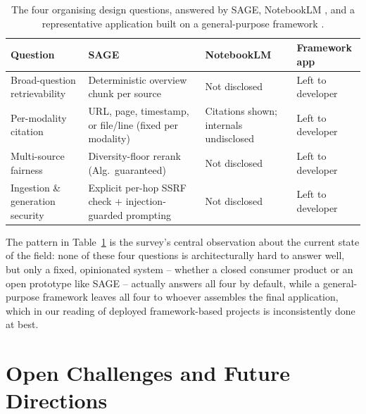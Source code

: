 \documentclass[conference]{IEEEtran}
\begin{document}
\begin{table}[t]
\caption{The four organising design questions, answered by SAGE, NotebookLM \cite{notebooklm2026}, and a representative application built on a general-purpose framework \cite{langchain2026,llamaindex2026,haystack2026}.}
\label{tab:axes}
\centering
\begin{tabular}{p{1.6cm}p{1.7cm}p{1.7cm}p{1.7cm}}
\hline
\textbf{Question} & \textbf{SAGE} & \textbf{NotebookLM} & \textbf{Framework app} \\
\hline
Broad-question retrievability & Deterministic overview chunk per source & Not disclosed & Left to developer \\
Per-modality citation & URL, page, timestamp, or file/line (fixed per modality) & Citations shown; internals undisclosed & Left to developer \\
Multi-source fairness & Diversity-floor rerank (Alg.\ guaranteed) & Not disclosed & Left to developer \\
Ingestion \& generation security & Explicit per-hop SSRF check + injection-guarded prompting & Not disclosed & Left to developer \\
\hline
\end{tabular}
\end{table}

The pattern in Table~\ref{tab:axes} is the survey's central observation
about the current state of the field: none of these four questions is
architecturally hard to answer well, but only a fixed, opinionated
system -- whether a closed consumer product or an open prototype like
SAGE -- actually answers all four by default, while a general-purpose
framework leaves all four to whoever assembles the final application,
which in our reading of deployed framework-based projects is
inconsistently done at best.

\section{Open Challenges and Future Directions}
\end{document}
